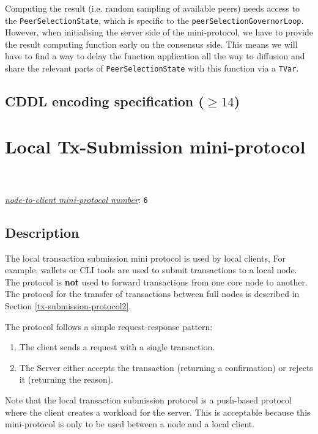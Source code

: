 Computing the result (i.e. random sampling of available peers) needs access to the
\texttt{PeerSelectionState}, which is specific to the \texttt{peerSelectionGovernorLoop}. However, when
initialising the server side of the mini-protocol, we have to provide the result computing
function early on the consensus side. This means we will have to find a way to delay the
function application all the way to diffusion and share the relevant parts of
\texttt{PeerSelectionState} with this function via a \texttt{TVar}.

\subsection{CDDL encoding specification ($\geq 14$)}\label{peersharing-cddl}


\section{Local Tx-Submission mini-protocol}
\\
\\
\hyperref[table:node-to-client-protocol-numbers]{\textit{node-to-client mini-protocol number}}: \texttt{6}\\
\label{local-tx-submission-protocol}
\subsection{Description}
The local transaction submission mini protocol is used by local clients,
For example, wallets or CLI tools are used to submit transactions to a local node.
The protocol is {\bf not} used to forward transactions from one core node to another.
The protocol for the transfer of transactions between full nodes
is described in Section \ref{tx-submission-protocol2}.

The protocol follows a simple request-response pattern:
\begin{enumerate}
\item The client sends a request with a single transaction.
\item The Server either accepts the transaction (returning a confirmation) or rejects it (returning the
  reason).
\end{enumerate}
Note that the local transaction submission protocol is a push-based protocol where the client
creates a workload for the server.
This is acceptable because this mini-protocol is only to be used between a node and a local client.
\newcommand{\MsgSubmitTx}{\msg{MsgSubmitTx}}
\newcommand{\MsgAcceptTx}{\msg{MsgAcceptTx}}
\newcommand{\MsgRejectTx}{\msg{MsgRejectTx}}

